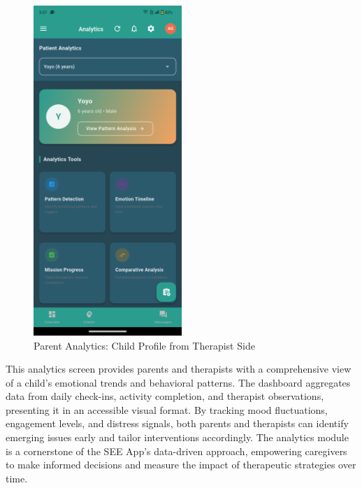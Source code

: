 ﻿\documentclass[12pt,a4paper]{article}
\begin{document}
\begin{figure}[H]
    \centering
    \includegraphics[width=0.5\textwidth]{Screenshots/parentanalytics(childprofilefromtherapistside).png}
    \caption{Parent Analytics: Child Profile from Therapist Side}
    \label{fig:parent-analytics-therapist}
\end{figure}
This analytics screen provides parents and therapists with a comprehensive view of a child's emotional trends and behavioral patterns. The dashboard aggregates data from daily check-ins, activity completion, and therapist observations, presenting it in an accessible visual format. By tracking mood fluctuations, engagement levels, and distress signals, both parents and therapists can identify emerging issues early and tailor interventions accordingly. The analytics module is a cornerstone of the SEE App's data-driven approach, empowering caregivers to make informed decisions and measure the impact of therapeutic strategies over time.
\end{document}
